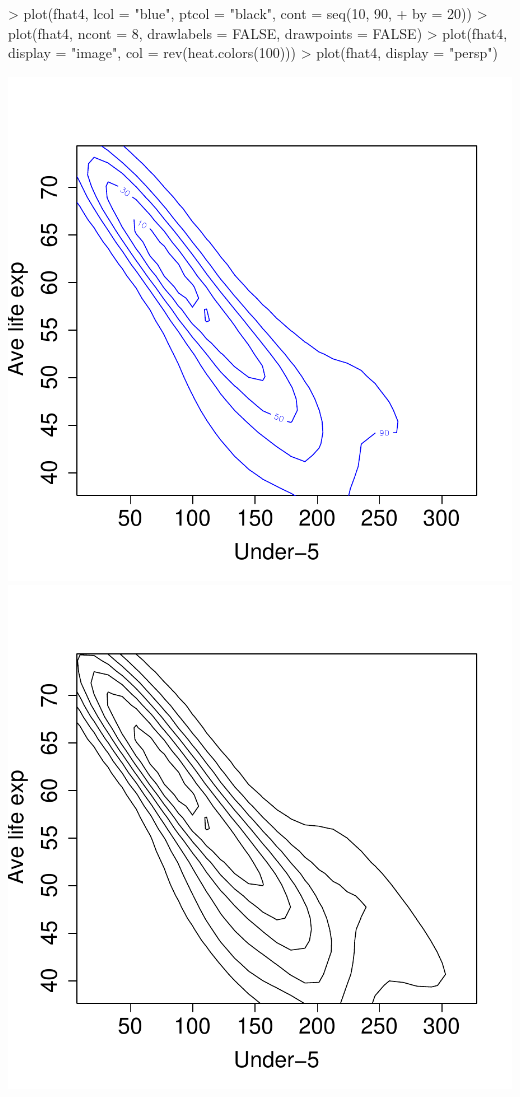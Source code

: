 \documentclass[a4paper,11pt]{article}
\begin{document}
\begin{Schunk}
\begin{Sinput}
> plot(fhat4, lcol = "blue", ptcol = "black", cont = seq(10, 90, 
+     by = 20))
> plot(fhat4, ncont = 8, drawlabels = FALSE, drawpoints = FALSE)
> plot(fhat4, display = "image", col = rev(heat.colors(100)))
> plot(fhat4, display = "persp")
\end{Sinput}
\end{Schunk}
\begin{center}
\includegraphics{kde-019}
\includegraphics{kde-020}

\end{center}
\end{document}
